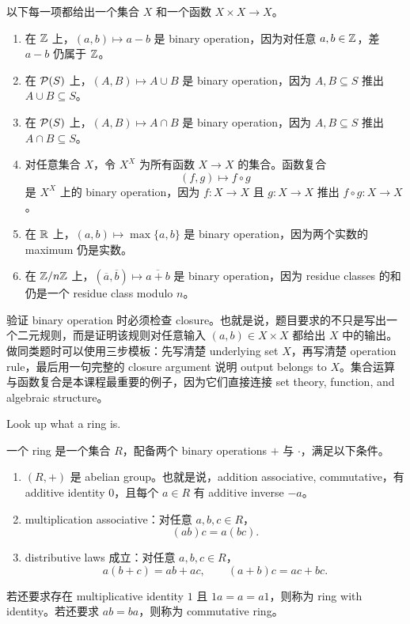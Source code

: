 \begin{solution}
以下每一项都给出一个集合 \(X\) 和一个函数 \(X\times X\to X\)。
\begin{enumerate}[label=(\alph*)]
  \item 在 \(\mathbb{Z}\) 上，\((a,b)\mapsto a-b\) 是 binary operation，因为对任意 \(a,b\in\mathbb{Z}\)，差 \(a-b\) 仍属于 \(\mathbb{Z}\)。
  \item 在 \(\mathcal{P}(S)\) 上，\((A,B)\mapsto A\cup B\) 是 binary operation，因为 \(A,B\subseteq S\) 推出 \(A\cup B\subseteq S\)。
  \item 在 \(\mathcal{P}(S)\) 上，\((A,B)\mapsto A\cap B\) 是 binary operation，因为 \(A,B\subseteq S\) 推出 \(A\cap B\subseteq S\)。
  \item 对任意集合 \(X\)，令 \(X^X\) 为所有函数 \(X\to X\) 的集合。函数复合
  \[
    (f,g)\mapsto f\circ g
  \]
  是 \(X^X\) 上的 binary operation，因为 \(f:X\to X\) 且 \(g:X\to X\) 推出 \(f\circ g:X\to X\)。
  \item 在 \(\mathbb{R}\) 上，\((a,b)\mapsto \max\{a,b\}\) 是 binary operation，因为两个实数的 maximum 仍是实数。
  \item 在 \(\mathbb{Z}/n\mathbb{Z}\) 上，\((\overline a,\overline b)\mapsto \overline{a+b}\) 是 binary operation，因为 residue classes 的和仍是一个 residue class modulo \(n\)。
\end{enumerate}
\end{solution}

\begin{explanation}
验证 binary operation 时必须检查 closure。也就是说，题目要求的不只是写出一个二元规则，而是证明该规则对任意输入 \((a,b)\in X\times X\) 都给出 \(X\) 中的输出。做同类题时可以使用三步模板：先写清楚 underlying set \(X\)，再写清楚 operation rule，最后用一句完整的 closure argument 说明 output belongs to \(X\)。集合运算与函数复合是本课程最重要的例子，因为它们直接连接 set theory, function, and algebraic structure。
\end{explanation}

\begin{exerciseblock}
Look up what a ring is.
\end{exerciseblock}

\begin{solution}
一个 ring 是一个集合 \(R\)，配备两个 binary operations \(+\) 与 \(\cdot\)，满足以下条件。
\begin{enumerate}[label=(\arabic*)]
  \item \((R,+)\) 是 abelian group。也就是说，addition associative, commutative，有 additive identity \(0\)，且每个 \(a\in R\) 有 additive inverse \(-a\)。
  \item multiplication associative：对任意 \(a,b,c\in R\)，
  \[
    (ab)c=a(bc).
  \]
  \item distributive laws 成立：对任意 \(a,b,c\in R\)，
  \[
    a(b+c)=ab+ac,\qquad (a+b)c=ac+bc.
  \]
\end{enumerate}
若还要求存在 multiplicative identity \(1\) 且 \(1a=a=a1\)，则称为 ring with identity。若还要求 \(ab=ba\)，则称为 commutative ring。
\end{solution}

